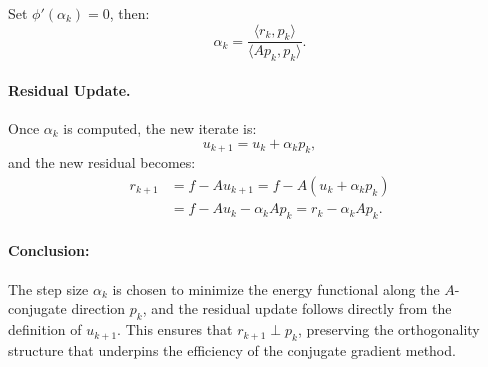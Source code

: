\documentclass[12pt]{article}
\begin{document}
Set \( \phi'(\alpha_k) = 0 \), then:
\[
\alpha_k = \frac{\langle r_k, p_k \rangle}{\langle A p_k, p_k \rangle}.
\]

\paragraph{Residual Update.}

Once \( \alpha_k \) is computed, the new iterate is:
\[
u_{k+1} = u_k + \alpha_k p_k,
\]
and the new residual becomes:
\begin{align*}
r_{k+1} &= f - A u_{k+1} = f - A(u_k + \alpha_k p_k) \\
&= f - A u_k - \alpha_k A p_k = r_k - \alpha_k A p_k.
\end{align*}

\paragraph{Conclusion:}

The step size \( \alpha_k \) is chosen to minimize the energy functional along the \( A \)-conjugate direction \( p_k \), and the residual update follows directly from the definition of \( u_{k+1} \). This ensures that \( r_{k+1} \perp p_k \), preserving the orthogonality structure that underpins the efficiency of the conjugate gradient method.
\end{document}
